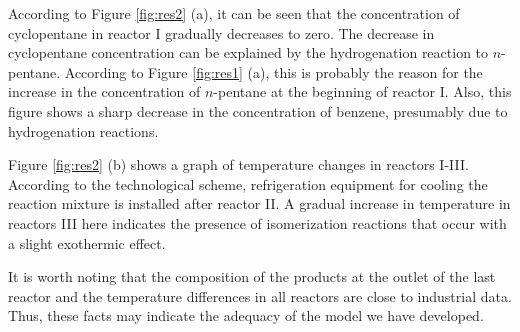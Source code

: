 \documentclass[mathematics,article,submit,pdftex,moreauthors]{Definitions/mdpi}
\begin{document}
According to Figure \ref{fig:res2} (a), it can be seen that the concentration of cyclopentane in reactor I gradually decreases to zero.  The decrease in cyclopentane concentration can be explained by the hydrogenation reaction to $n$-pentane. According to Figure \ref{fig:res1} (a), this is probably the reason for the increase in the concentration of $n$-pentane at the beginning of reactor I.
Also, this figure shows a sharp decrease in the concentration of benzene, presumably due to hydrogenation reactions.

Figure \ref{fig:res2} (b) shows a graph of temperature changes in reactors I-III. According to the technological scheme, refrigeration equipment for cooling the reaction mixture is installed after reactor II. A gradual increase in temperature in reactors III here indicates the presence of isomerization reactions that occur with a slight exothermic effect.

It is worth noting that the composition of the products at the outlet of the last reactor and the temperature differences in all reactors are close to industrial data. Thus, these facts may indicate the adequacy of the model we have developed.


\vspace{6pt} 








\end{document}
